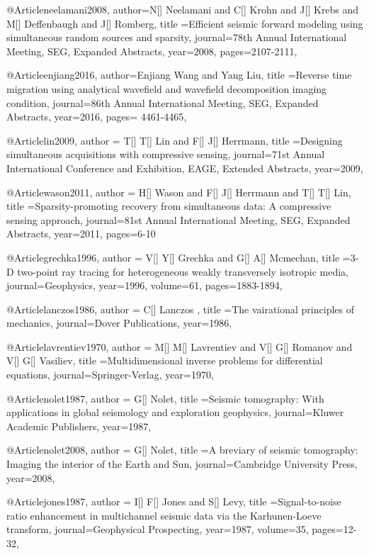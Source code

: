 {@Article{neelamani2008,
  author={N[] Neelamani and C[] Krohn and J[] Krebs and M[] Deffenbaugh and J[] Romberg},
  title ={Efficient seismic forward modeling using simultaneous random sources and sparsity},
  journal={78th Annual International Meeting, SEG, Expanded Abstracts},
  year=2008,
  pages={2107-2111},
}

@Article{enjiang2016,
  author={Enjiang Wang and Yang Liu},
  title ={Reverse time migration using analytical wavefield and wavefield decomposition imaging
condition},
  journal={86th Annual International Meeting, SEG, Expanded Abstracts},
  year=2016,
  pages={ 4461-4465},
}

@Article{lin2009,
  author = {T[] T[] Lin and F[] J[] Herrmann},
  title ={Designing simultaneous acquisitions with compressive sensing},
  journal={71st Annual International Conference and Exhibition, EAGE, Extended Abstracts},
  year=2009,
}

@Article{wason2011,
  author = {H[] Wason and F[] J[] Herrmann and T[] T[] Lin},
  title ={Sparsity-promoting recovery from simultaneous data: A compressive sensing approach},
  journal={81st Annual International Meeting, SEG, Expanded Abstracts},
  year=2011,
  pages={6-10}
}

@Article{grechka1996,
  author = {V[] Y[] Grechka and G[] A[] Mcmechan},
  title ={3-D two-point ray tracing for heterogeneous weakly transversely isotropic media},
  journal={Geophysics},
  year=1996,
  volume=61,
  pages={1883-1894},
}

@Article{lanczos1986,
  author = {C[] Lanczos },
  title ={The vairational principles of mechanics},
  journal={Dover Publications},
  year=1986,
}

@Article{lavrentiev1970,
  author = {M[] M[] Lavrentiev and V[] G[] Romanov and V[] G[] Vasiliev},
  title ={Multidimensional inverse problems for differential equations},
  journal={Springer-Verlag},
  year=1970,
}

@Article{nolet1987,
  author = {G[] Nolet},
  title ={Seismic tomography: With applications in global seismology and exploration geophysics},
  journal={Kluwer Academic Publishers},
  year=1987,
}

@Article{nolet2008,
  author = {G[] Nolet},
  title ={A breviary of seismic tomography: Imaging the interior of the Earth and Sun},
  journal={Cambridge University Press},
  year=2008,
}

@Article{jones1987,
  author = {I[] F[] Jones and S[] Levy},
  title ={Signal-to-noise ratio enhancement in multichannel seismic data via the Karhunen-Loeve transform},
  journal={Geophysical Prospecting},
  year=1987,
  volume=35,
  pages={12-32},
}

}
